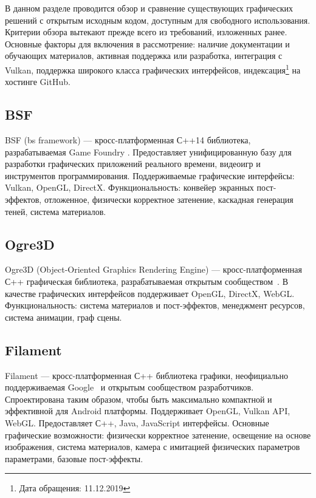 \documentclass[14pt]{matmex-diploma}
\begin{document}
В данном разделе проводится обзор и сравнение существующих графических решений с открытым исходным кодом, доступным для свободного использования. Критерии обзора вытекают прежде всего из требований, изложенных ранее. Основные факторы для включения в рассмотрение: наличие документации и обучающих материалов, активная поддержка или разработка, интеграция с Vulkan, поддержка широкого класса графических интерфейсов, индексация\footnote{Дата обращения: 11.12.2019} на хостинге GitHub.

\subsection{BSF}

BSF (bs framework) --- кросс-платформенная С++14 библиотека, разрабатываемая Game Foundry \cite{github:bsf}. Предоставляет унифицированную базу для разработки графических приложений реального времени, видеоигр и инструментов программирования. Поддерживаемые графические интерфейсы: Vulkan, OpenGL, DirectX. Функциональность: конвейер экранных пост-эффектов, отложенное, физически корректное затенение, каскадная генерация теней, система материалов.

\subsection{Ogre3D}

Ogre3D (Object-Oriented Graphics Rendering Engine) --- кросс-платформенная С++ графическая библиотека, разрабатываемая открытым сообществом~\cite{github:ogre3d}. В качестве графических интерфейсов поддерживает OpenGL, DirectX, WebGL. Функциональность: система материалов и пост-эффектов, менеджмент ресурсов, система анимации, граф сцены.  

\subsection{Filament}
    
Filament --- кросс-платформенная С++ библиотека графики, неофициально поддерживаемая Google~\cite{github:filament} и открытым сообществом разработчиков. Спроектирована таким образом, чтобы быть максимально компактной и эффективной для Android платформы. Поддерживает OpenGL, Vulkan API, WebGL. Предоставляет С++, Java, JavaScript интерфейсы. Основные графические возможности: физически корректное затенение, освещение на основе изображения, система материалов, камера с имитацией физических параметров параметрами, базовые пост-эффекты. 
\end{document}
